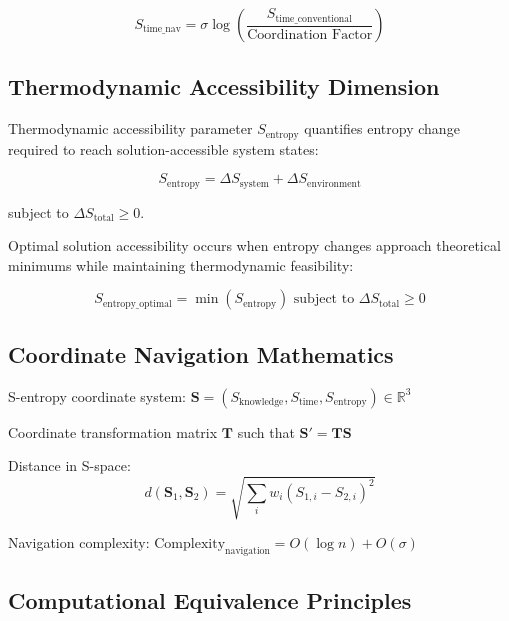 \documentclass[12pt,a4paper]{article}
\begin{document}
\begin{equation}
S_{\text{time\_nav}} = \sigma \log\left(\frac{S_{\text{time\_conventional}}}{\text{Coordination Factor}}\right)
\end{equation}

\subsection{Thermodynamic Accessibility Dimension}

Thermodynamic accessibility parameter $S_{\text{entropy}}$ quantifies entropy change required to reach solution-accessible system states:

\begin{equation}
S_{\text{entropy}} = \Delta S_{\text{system}} + \Delta S_{\text{environment}}
\end{equation}

subject to $\Delta S_{\text{total}} \geq 0$.

Optimal solution accessibility occurs when entropy changes approach theoretical minimums while maintaining thermodynamic feasibility:

\begin{equation}
S_{\text{entropy\_optimal}} = \min\left(S_{\text{entropy}}\right) \text{ subject to } \Delta S_{\text{total}} \geq 0
\end{equation}

\subsection{Coordinate Navigation Mathematics}

S-entropy coordinate system: $\mathbf{S} = (S_{\text{knowledge}}, S_{\text{time}}, S_{\text{entropy}}) \in \mathbb{R}^3$

Coordinate transformation matrix $\mathbf{T}$ such that $\mathbf{S}' = \mathbf{T} \mathbf{S}$

Distance in S-space:
\begin{equation}
d(\mathbf{S}_1, \mathbf{S}_2) = \sqrt{\sum_{i} w_i (S_{1,i} - S_{2,i})^2}
\end{equation}

Navigation complexity: $\text{Complexity}_{\text{navigation}} = O(\log n) + O(\sigma)$

\subsection{Computational Equivalence Principles}
\end{document}
